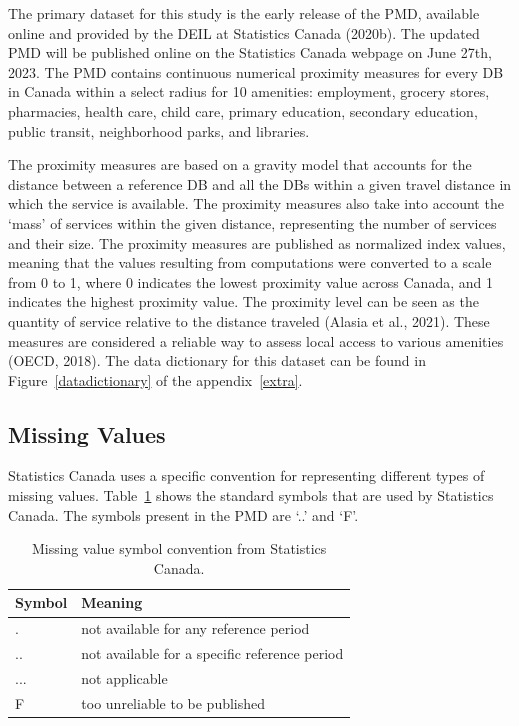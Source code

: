 \documentclass[11pt, a4paper]{article}
\begin{document}
The primary dataset for this study is the early release of the PMD, available online and provided by the DEIL at Statistics Canada (2020b). The updated PMD will be published online on the Statistics Canada webpage on June 27th, 2023. The PMD contains continuous numerical proximity measures for every DB in Canada within a select radius for 10 amenities: employment, grocery stores, pharmacies, health care, child care, primary education, secondary education, public transit, neighborhood parks, and libraries.
\par
The proximity measures are based on a gravity model that accounts for the distance between a reference DB and all the DBs within a given travel distance in which the service is available. The proximity measures also take into account the `mass' of services within the given distance, representing the number of services and their size. The proximity measures are published as normalized index values, meaning that the values resulting from computations were converted to a scale from 0 to 1, where 0 indicates the lowest proximity value across Canada, and 1 indicates the highest proximity value. The proximity level can be seen as the quantity of service relative to the distance traveled (Alasia et al., 2021). These measures are considered a reliable way to assess local access to various amenities (OECD, 2018). The data dictionary for this dataset can be found in Figure~\ref{datadictionary} of the appendix~\ref{extra}.







\subsection{Missing Values}


Statistics Canada uses a specific convention for representing different types of missing values. Table~\ref{missingvalues} shows the standard symbols that are used by Statistics Canada. The symbols present in the PMD are `..' and `F'.





\begin{table}[H]
\centering
\caption[Missing value symbols]{Missing value symbol convention from Statistics Canada.}\label{missingvalues}
\begin{tabular}{|l|l|}
\hline
\textbf{Symbol} & \textbf{Meaning} \\
\hline
. & not available for any reference period \\
\hline
.. & not available for a specific reference period \\
\hline
... & not applicable \\
\hline
F & too unreliable to be published \\
\hline
\end{tabular}
\end{table}
\end{document}

